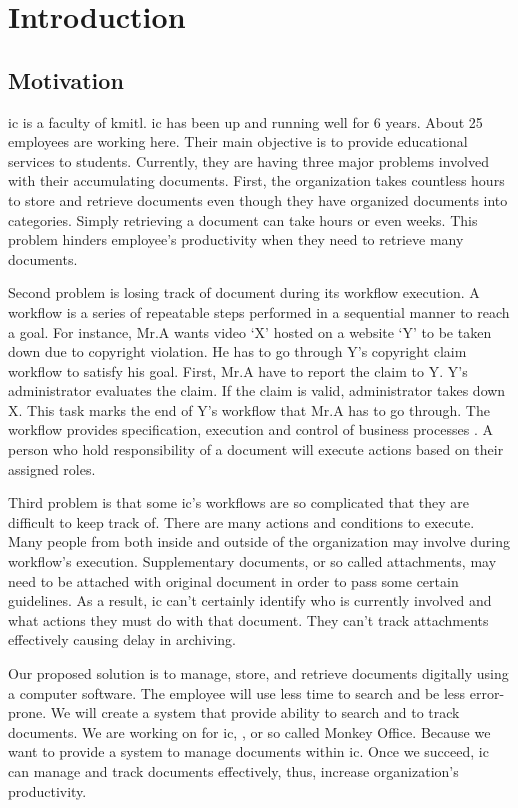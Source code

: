 \chapter{Introduction}

\section{Motivation}
\gls{ic} is a faculty of \gls{kmitl}. 
\gls{ic} has been up and running well for 6 years.
About 25 employees are working here.
Their main objective is to provide educational services to students. 
Currently, they are having three major problems involved with their accumulating documents.
First, the organization takes countless hours to store and retrieve documents even though they have organized documents into categories.
Simply retrieving a document can take hours or even weeks. 
This problem hinders employee's productivity when they need to retrieve many documents. 

Second problem is losing track of document during its workflow execution. 
A workflow is a series of repeatable steps performed in a sequential manner to reach a goal.
For instance, Mr.A wants video \enquote*{X} hosted on a website \enquote*{Y} to be taken down due to copyright violation.
He has to go through Y's copyright claim workflow to satisfy his goal.
First, Mr.A have to report the claim to Y.
Y's administrator evaluates the claim.
If the claim is valid, administrator takes down X.
This task marks the end of Y's workflow that Mr.A has to go through.
The workflow provides specification, execution and control of business processes \cite{Jablonski:1996:WMM}. 
A person who hold responsibility of a document will execute actions based on their assigned roles.

Third problem is that some \gls{ic}'s workflows are so complicated that they are difficult to keep track of.
There are many actions and conditions to execute.
Many people from both inside and outside of the organization may involve during workflow's execution.
Supplementary documents, or so called attachments, may need to be attached with original document in order to pass some certain guidelines.
As a result, \gls{ic} can't certainly identify who is currently involved and what actions they must do with that document.
They can't track attachments effectively causing delay in archiving.

Our proposed solution is to manage, store, and retrieve documents digitally using a computer software.
The employee will use less time to search and be less error-prone.
We will create a system that provide ability to search and to track documents.
We are working on \MakeLowercase{\projTitle} for \gls{ic}, \kmitl, or so called Monkey Office.
Because we want to provide a system to manage documents within \gls{ic}.
Once we succeed, \gls{ic} can manage and track documents effectively, thus, increase organization's productivity.

